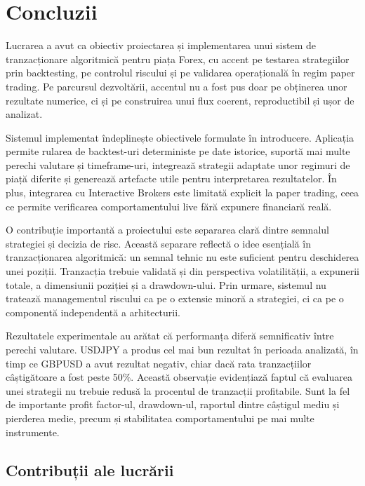 \chapter{Concluzii}
\label{cap:cap5}

Lucrarea a avut ca obiectiv proiectarea și implementarea unui sistem de tranzacționare algoritmică pentru piața Forex, cu accent pe testarea strategiilor prin backtesting, pe controlul riscului și pe validarea operațională în regim paper trading. Pe parcursul dezvoltării, accentul nu a fost pus doar pe obținerea unor rezultate numerice, ci și pe construirea unui flux coerent, reproductibil și ușor de analizat.

Sistemul implementat îndeplinește obiectivele formulate în introducere. Aplicația permite rularea de backtest-uri deterministe pe date istorice, suportă mai multe perechi valutare și timeframe-uri, integrează strategii adaptate unor regimuri de piață diferite și generează artefacte utile pentru interpretarea rezultatelor. În plus, integrarea cu Interactive Brokers este limitată explicit la paper trading, ceea ce permite verificarea comportamentului live fără expunere financiară reală.

O contribuție importantă a proiectului este separarea clară dintre semnalul strategiei și decizia de risc. Această separare reflectă o idee esențială în tranzacționarea algoritmică: un semnal tehnic nu este suficient pentru deschiderea unei poziții. Tranzacția trebuie validată și din perspectiva volatilității, a expunerii totale, a dimensiunii poziției și a drawdown-ului. Prin urmare, sistemul nu tratează managementul riscului ca pe o extensie minoră a strategiei, ci ca pe o componentă independentă a arhitecturii.

Rezultatele experimentale au arătat că performanța diferă semnificativ între perechi valutare. USDJPY a produs cel mai bun rezultat în perioada analizată, în timp ce GBPUSD a avut rezultat negativ, chiar dacă rata tranzacțiilor câștigătoare a fost peste 50\%. Această observație evidențiază faptul că evaluarea unei strategii nu trebuie redusă la procentul de tranzacții profitabile. Sunt la fel de importante profit factor-ul, drawdown-ul, raportul dintre câștigul mediu și pierderea medie, precum și stabilitatea comportamentului pe mai multe instrumente.

\section{Contribuții ale lucrării}
\label{cap:cap5:contributii}

